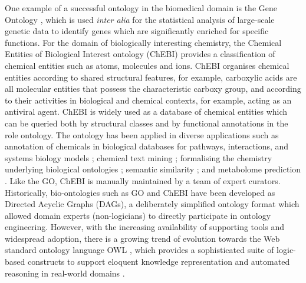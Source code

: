 \documentclass[10pt]{bmc_article}
\newenvironment{bmcformat}{\baselineskip20pt\sloppy\setboolean{publ}{false}}{\baselineskip20pt\sloppy}
\begin{document}
\begin{bmcformat}
One example of a successful ontology in the biomedical domain is the Gene Ontology \cite{go2000}, which is used \textit{inter alia} for the statistical analysis of large-scale genetic data to identify genes which are significantly enriched for specific functions.  For the domain of biologically interesting chemistry, the Chemical Entities of Biological Interest ontology (ChEBI) \cite{chebi2010} provides a classification of chemical entities such as atoms, molecules and ions.  ChEBI organises chemical entities according to shared structural features, for example, carboxylic acids are all molecular entities that possess the characteristic carboxy group, and according to their activities in biological and chemical contexts, for example, acting as an antiviral agent. ChEBI is widely used as a database of chemical entities which can be queried both by structural classes and by functional annotations in the role ontology. The ontology has been applied in diverse applications such as annotation of chemicals in biological databases for pathways, interactions, and systems biology models \cite{matthews2009,libiomodels2010,kerrien2007}; chemical text mining \cite{corbett2006}; formalising the chemistry underlying biological ontologies \cite{mungall2010}; semantic similarity \cite{couto2011}; and metabolome prediction \cite{swainston2010}. Like the GO, ChEBI is manually maintained by a team of expert curators.  Historically, bio-ontologies such as GO and ChEBI have been developed as Directed Acyclic Graphs (DAGs), a deliberately simplified ontology format which allowed domain experts (non-logicians) to directly participate in ontology engineering. However, with the increasing availability of supporting tools and widespread adoption, there is a growing trend of evolution  towards the Web standard ontology language OWL \cite{owlformat}, which provides a sophisticated suite of logic-based constructs to support eloquent knowledge representation and automated reasoning in real-world domains \cite{alterovitz2010}. 


\end{bmcformat}
\end{document}
